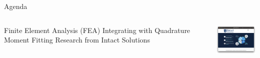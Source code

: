 \begin{frame}{Agenda}
\begin{columns}
\centering
\begin{outline}
  \1 Finite Element Analysis (FEA)
  \1 Integrating with Quadrature
  \1 Moment Fitting
  \2 Research from Intact Solutions \cite{Taber2018,Kumar2020}
\end{outline}

\centering
\includegraphics[width=3.5cm]{intact_website.png}


\end{columns}
\end{frame}


